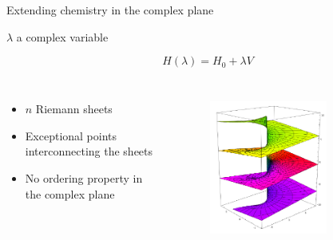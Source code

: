 \documentclass[xcolor=x11names,compress]{beamer}
\renewcommand{\(}{\begin{columns}}
\renewcommand{\)}{\end{columns}}
\newcommand{\<}[1]{\begin{column}{#1}}
\renewcommand{\>}{\end{column}}
\begin{document}
\begin{frame}{Extending chemistry in the complex plane}

\begin{beamerboxesrounded}[scheme=foncé]{\centering $\lambda$ a complex variable}

\begin{equation*}
   H(\lambda) = H_0 + \lambda V
\end{equation*}

\end{beamerboxesrounded}

\begin{columns}


\begin{itemize}
    \item $n$ Riemann sheets
    \vspace{0.3cm}
    \item Exceptional points interconnecting the sheets
    \vspace{0.3cm}
    \item No ordering property in the complex plane
\end{itemize}


\begin{figure}
    \centering
    \includegraphics[width=0.7\textwidth]{riemannsheet.png}
    \label{fig:my_label}
\end{figure}

\end{columns}

\end{frame}
\end{document}
